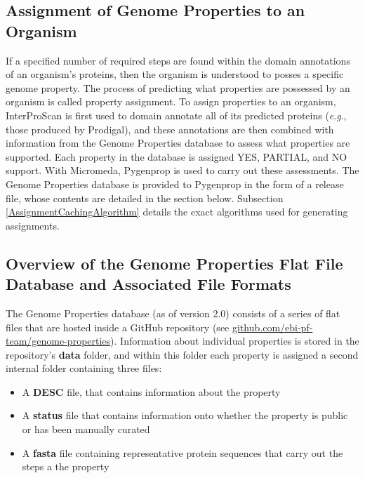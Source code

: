 \subsection{Assignment of Genome Properties to an Organism}

If a specified number of required steps are found within the domain annotations 
of an organism's proteins, then the organism is understood to posses a specific 
genome property. The process of predicting what properties are possessed by an 
organism is called property assignment. To assign properties to an organism, 
InterProScan is first used to domain annotate all of its predicted proteins 
(\textit{e}.\textit{g}., those produced by Prodigal), and these annotations are then combined with 
information from the Genome Properties database to assess what properties are 
supported. Each property in the database is assigned YES, PARTIAL, and NO 
support. With Micromeda, Pygenprop is used to carry out these assessments. The 
Genome Properties database is provided to Pygenprop in the form of a release 
file, whose contents are detailed in the section below. Subsection 
\ref{AssignmentCachingAlgorithm} details the exact algorithms used for 
generating assignments.  

\subsection{Overview of the Genome Properties Flat File Database and Associated 
File Formats} \label{Genome-Properties-Files} 

The Genome Properties database (as of version 2.0) consists of a series of flat 
files that are hosted inside a GitHub repository (see 
\href{http://github.com/ebi-pf-team/genome-properties}{github.com/ebi-pf-team/genome-properties}). 
Information about individual properties is stored in the repository's 
\textbf{data} folder, and within this folder each property is assigned a second 
internal folder containing three files: 

\begin{itemize}
\item A \textbf{DESC} file, that contains information about the property
\item A \textbf{status} file that contains information onto whether the property 
is public or has been manually curated
\item A \textbf{\gls{fasta}} \cite{pearson19905} file containing representative 
protein sequences that carry out the steps a the property
\end{itemize}

